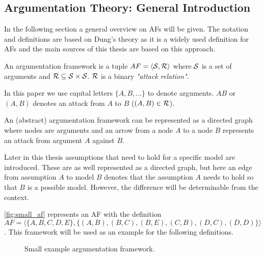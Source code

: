 \subsection{Argumentation Theory: General Introduction}
\glsresetall
\label{sub:dung}
In the following section a general overview on \glspl{AF} will be given. The notation and definitions are based on Dung's theory \cite{dung1995} as it is a widely used definition for \glspl{AF} and the main sources of this thesis \cite{Modgil2009,sassoon2016,sassoon2014,sassoon2016CD} are based on this approach.
\begin{definition}
	An argumentation framework is a tuple $AF = \langle \S, \R \rangle$ where $\S$ is a set of arguments and $ \R \subseteq \S \times \S$. $\R$ is a binary \textit{"attack relation"}.
\end{definition}

\begin{notation}
In this paper we use capital letters $\{A, B, ...\}$ to denote arguments. $AB$ or $(A, B)$ denotes an attack from $A$ to $B$ ($(A,B) \in \R$).	
\end{notation}

\begin{remark}
An (abstract) argumentation framework can be represented as a directed graph where nodes are arguments and an arrow from a node $A$ to a node $B$ represents an attack from argument $A$ against $B$.
\end{remark}

\begin{remark}
	Later in this thesis assumptions that need to hold for a specific model are introduced. These are as well represented as a directed graph, but here an edge from assumption $A$ to model $B$ denotes that the assumption $A$ needs to hold so that $B$ is a possible model. However, the difference will be determinable from the context.
\end{remark}


\begin{exa}
 \autoref{fig:small_af} represents an \gls{AF} with the definition $AF = \langle \{A, B, C, D, E\}, \allowbreak \{(A,B), (B, C),\allowbreak (B, E), (C, B),\allowbreak (D,C), (D,D)\} \rangle $. This framework will be used as an example for the following definitions.
\end{exa}


\begin{figure}[!htb]
\centering
{}
\caption{Small example argumentation framework.}
\label{fig:small_af}
\end{figure}


